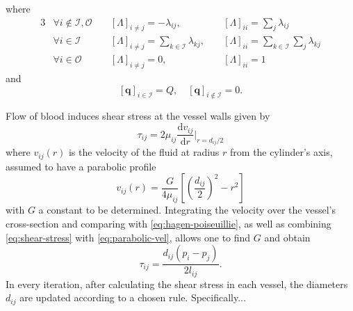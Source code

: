 \documentclass[aps,pra,a4paper,twocolumn,10pt,superscriptaddress,longbibliography]{revtex4-1}
\newcommand{\mat}[1]{\bm{\mathit{#1}}}
\begin{document}
where
\begin{alignat}{3}
& \forall i \not\in \mathcal{I}, \mathcal{O} \; && \left[\mat{\Lambda}\right]_{i \neq j} = -\lambda_{ij}, \; & &  \left[\mat{\Lambda}\right]_{i i} = \sum_{j} \lambda_{ij}\\
& \forall i \in \mathcal{I} \; && \left[\mat{\Lambda}\right]_{i \neq j} = \sum_{k \in \mathcal{I}} \lambda_{kj}, \; & & \left[\mat{\Lambda}\right]_{i i} =  \sum_{k \in \mathcal{I}} \sum_{j} \lambda_{kj}\\
& \forall i \in \mathcal{O} \; && \left[\mat{\Lambda}\right]_{i \neq j} = 0, \; & & \left[\mat{\Lambda}\right]_{i i} = 1
\end{alignat}
and 
\begin{equation}
\left[\mathbf{q}\right]_{i \in \mathcal{I}} = Q, \quad \left[\mathbf{q}\right]_{i \not\in \mathcal{I}} = 0. 
\end{equation}

Flow of blood induces shear stress at the vessel walls given by 
\begin{equation}
\label{eq:shear-stress}
\tau_{ij} = 2 \mu_{ij} \frac{\mathrm{d}v_{ij}}{\mathrm{d}r} \Big |_{r = d_{ij} / 2}
\end{equation}
where $v_{ij}(r)$ is the velocity of the fluid at radius $r$ from the cylinder's axis, assumed to have a parabolic profile
\begin{equation}
\label{eq:parabolic-vel}
v_{ij}(r) = \frac{G}{4 \mu_{ij}} \left[ \left(\frac{d_{ij}}{2}\right)^2 - r^2 \right ]
\end{equation}
with $G$ a constant to be determined. Integrating the velocity over the vessel's cross-section and comparing with \eqref{eq:hagen-poiseuillie}, as well as combining \eqref{eq:shear-stress} with \eqref{eq:parabolic-vel}, allows one to find $G$ and obtain
\begin{equation}
\tau_{ij} = \frac{d_{ij} (p_i - p_j)}{2 l_{ij}}.
\end{equation}
In every iteration, after calculating the shear stress in each vessel, the diameters $d_{ij}$ are updated according to a chosen rule. Specifically...
%
\end{document}
